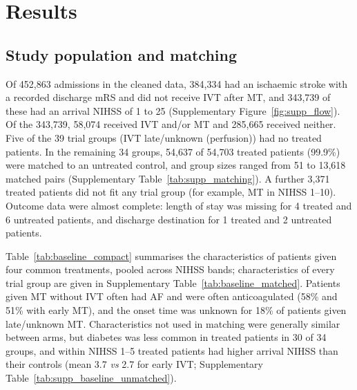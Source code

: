 \section{Results}

\subsection{Study population and matching}

Of 452,863 admissions in the cleaned data, 384,334 had an ischaemic stroke with a recorded discharge mRS and did not receive IVT after MT, and 343,739 of these had an arrival NIHSS of 1 to 25 (Supplementary Figure~\ref{fig:supp_flow}). Of the 343,739, 58,074 received IVT and/or MT and 285,665 received neither. Five of the 39 trial groups (IVT late/unknown (perfusion)) had no treated patients. In the remaining 34 groups, 54,637 of 54,703 treated patients (99.9\%) were matched to an untreated control, and group sizes ranged from 51 to 13,618 matched pairs (Supplementary Table~\ref{tab:supp_matching}). A further 3,371 treated patients did not fit any trial group (for example, MT in NIHSS 1--10). Outcome data were almost complete: length of stay was missing for 4 treated and 6 untreated patients, and discharge destination for 1 treated and 2 untreated patients.

Table~\ref{tab:baseline_compact} summarises the characteristics of patients given four common treatments, pooled across NIHSS bands; characteristics of every trial group are given in Supplementary Table~\ref{tab:baseline_matched}. Patients given MT without IVT often had AF and were often anticoagulated (58\% and 51\% with early MT), and the onset time was unknown for 18\% of patients given late/unknown MT. Characteristics not used in matching were generally similar between arms, but diabetes was less common in treated patients in 30 of 34 groups, and within NIHSS 1--5 treated patients had higher arrival NIHSS than their controls (mean 3.7 \textit{vs} 2.7 for early IVT; Supplementary Table~\ref{tab:supp_baseline_unmatched}).

